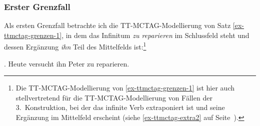 \subsubsection{Erster Grenzfall}

Als ersten Grenzfall betrachte ich die TT-MCTAG-Modellierung von Satz \ref{ex-ttmctag-grenzen-1}, in dem das Infinitum {\it zu reparieren} im Schlussfeld steht und dessen Ergänzung {\it ihn} Teil des Mittelfelds ist:\footnote{Die TT-MCTAG-Modellierung von \ref{ex-ttmctag-grenzen-1} ist hier auch stellvertretend für die TT-MCTAG-Modellierung von Fällen der 3.~Konstruktion, bei der das infinite Verb extraponiert ist und seine Ergänzung im Mittelfeld erscheint (siehe \ref{ex-ttmctag-extra2} auf Seite~\pageref{ex-ttmctag-extra2}).} 

\ex. Heute versucht ihn Peter zu reparieren. \label{ex-ttmctag-grenzen-1}

